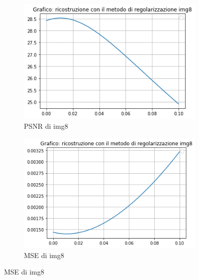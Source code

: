 \begin{figure}[H]
    \begin{subfigure}{0.5\textwidth}
        \centering
        \includegraphics[width=\textwidth]{output/PSNR/outputPSNR-img8.png}
        \caption{PSNR di img8}
        \label{fig:img8PSNR}
    \end{subfigure}\hfill
    \begin{subfigure}{0.5\textwidth}
        \centering
        \includegraphics[width=\textwidth]{output/MSE/outputMSE-img8.png}
        \caption{MSE di img8}
        \label{fig:img8MSE}
    \end{subfigure}
\end{figure}